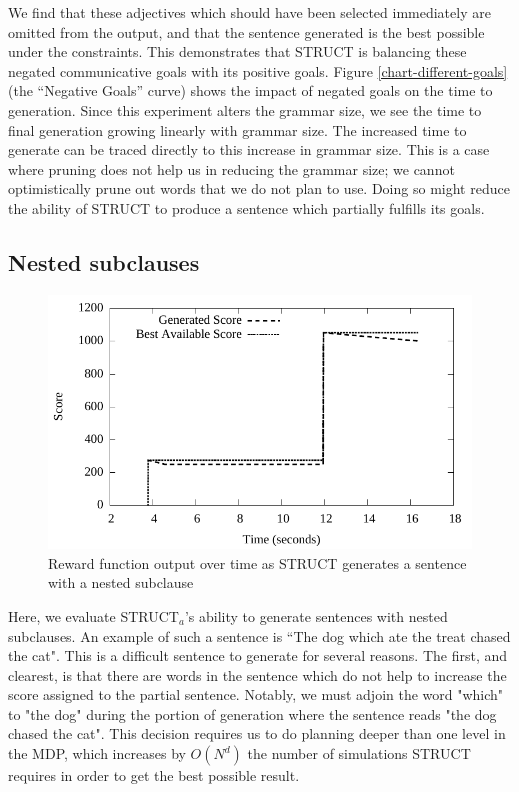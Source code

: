 We find that these adjectives which
should have been selected immediately are omitted from the output, and
that the sentence generated is the best possible under the
constraints.  This demonstrates that STRUCT is balancing these negated
communicative goals with its positive goals.  Figure
\ref{chart-different-goals} (the ``Negative Goals'' curve) shows the
impact of negated goals on the time to generation.  Since this
experiment alters the grammar size, we see the time to final
generation growing linearly with grammar size.  The increased time to
generate can be traced directly to this increase in grammar size.
This is a case where pruning does not help us in reducing the grammar size;
we cannot optimistically prune out words that we do not plan to use.  Doing
so might reduce the ability of STRUCT to produce a sentence which partially
fulfills its goals.

\subsection{Nested subclauses}

\begin{figure}
\centering
\includegraphics[width=0.7\linewidth]{../analysis/struct/nested/nested.pdf}
\caption{Reward function output over time as STRUCT generates a sentence with a nested subclause}
\label{nested}
\end{figure}

Here, we evaluate STRUCT$_a$'s ability to generate sentences with nested
subclauses.  An example of such a sentence is ``The dog which ate the treat
chased the cat".  This is a difficult sentence to generate for several reasons.
The first, and clearest, is that there are words in the sentence which do not
help to increase the score assigned to the partial sentence.  Notably, we must adjoin
the word "which" to "the dog" during the portion of generation where the
sentence reads "the dog chased the cat".  This decision requires us to do planning
deeper than one level in the MDP, which increases by $O(N^d)$ the number of simulations
STRUCT requires in order to get the best possible result.

